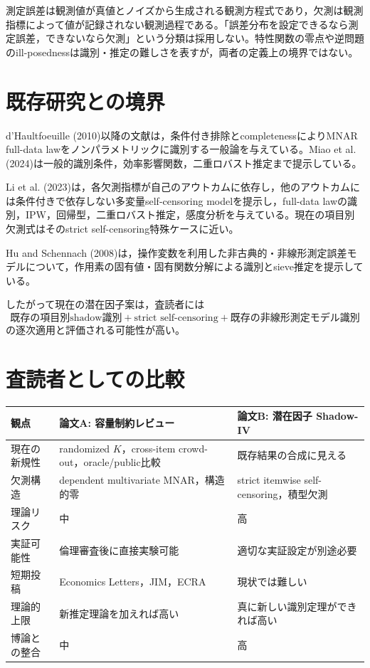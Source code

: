 \documentclass[a4paper,11pt,xelatex,ja=standard]{bxjsarticle}
\begin{document}
測定誤差は観測値が真値とノイズから生成される観測方程式であり，欠測は観測指標によって値が記録されない観測過程である。「誤差分布を設定できるなら測定誤差，できないなら欠測」という分類は採用しない。特性関数の零点や逆問題のill-posednessは識別・推定の難しさを表すが，両者の定義上の境界ではない。

\section{既存研究との境界}

d'Haultfoeuille (2010)以降の文献は，条件付き排除とcompletenessによりMNAR full-data lawをノンパラメトリックに識別する一般論を与えている。Miao et al. (2024)は一般的識別条件，効率影響関数，二重ロバスト推定まで提示している。

Li et al. (2023)は，各欠測指標が自己のアウトカムに依存し，他のアウトカムには条件付きで依存しない多変量self-censoring modelを提示し，full-data lawの識別，IPW，回帰型，二重ロバスト推定，感度分析を与えている。現在の項目別欠測式はそのstrict self-censoring特殊ケースに近い。

Hu and Schennach (2008)は，操作変数を利用した非古典的・非線形測定誤差モデルについて，作用素の固有値・固有関数分解による識別とsieve推定を提示している。

したがって現在の潜在因子案は，査読者には
\[
\text{既存の項目別shadow識別}
+\text{strict self-censoring}
+\text{既存の非線形測定モデル識別}
\]
の逐次適用と評価される可能性が高い。

\section{査読者としての比較}

\begin{center}
\small
\begin{tabular}{>{\raggedright\arraybackslash}p{}>{\raggedright\arraybackslash}p{}>{\raggedright\arraybackslash}p{}}
\toprule
観点 & 論文A: 容量制約レビュー & 論文B: 潜在因子 Shadow-IV\\
\midrule
現在の新規性 & randomized $K$，cross-item crowd-out，oracle/public比較 & 既存結果の合成に見える\\
欠測構造 & dependent multivariate MNAR，構造的零 & strict itemwise self-censoring，積型欠測\\
理論リスク & 中 & 高\\
実証可能性 & 倫理審査後に直接実験可能 & 適切な実証設定が別途必要\\
短期投稿 & Economics Letters，JIM，ECRA & 現状では難しい\\
理論的上限 & 新推定理論を加えれば高い & 真に新しい識別定理ができれば高い\\
博論との整合 & 中 & 高\\
\bottomrule
\end{tabular}
\end{center}
\end{document}
